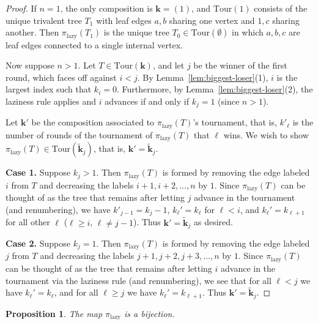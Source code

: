 \documentclass[11pt]{amsart}
\newcommand{\Tour}{\mathrm{Tour}}
\newcommand{\forget}{\pi_{\mathrm{lazy}}}
\newtheorem{prop}[thm]{Proposition}
\numberwithin{thm}{section}
\numberwithin{equation}{section}
\numberwithin{figure}{section}
\theoremstyle{definition}
\begin{document}
\begin{proof}
  If $n=1$, the only composition is $\mathbf{k}=(1)$, and $\Tour(1)$ consists of the unique trivalent tree $T_1$ with leaf edges $a,b$ sharing one vertex and $1,c$ sharing another.  Then $\forget(T_1)$ is the unique tree $T_0\in \Tour(\emptyset)$ in which $a,b,c$ are leaf edges connected to a single internal vertex. 
 
  Now suppose $n>1$.  Let $T\in \Tour(\mathbf{k})$, and let $j$ be the winner of the first round, which faces off against $i<j$. By Lemma~\ref{lem:biggest-loser}(1), $i$ is the largest index such that $k_i = 0$.  Furthermore, by Lemma~\ref{lem:biggest-loser}(2), the laziness rule applies and $i$ advances if and only if $k_j=1$ (since $n>1$).
  
  Let $\mathbf{k}'$ be the composition associated to $\forget(T)$'s tournament, that is, $k'_\ell$ is the number of rounds of the tournament of $\forget(T)$ that $\ell$ wins. We wish to show $\forget(T) \in \Tour(\widetilde{\mathbf{k}}_j)$, that is, $\mathbf{k}' = \widetilde{\mathbf{k}}_j$.
  
  \textbf{Case 1.} Suppose $k_j>1$. Then $\forget(T)$ is formed by removing the edge labeled $i$ from $T$ and decreasing the labels $i+1,i+2,\ldots,n$ by $1$.
  Since $\forget(T)$ can be thought of as the tree that remains after letting $j$ advance in the tournament (and renumbering), we have $k'_{j-1}=k_j-1$, $k_\ell'=k_\ell$ for $\ell<i$, and $k_\ell'=k_{\ell+1}$ for all other $\ell$ ($\ell\ge i$, $\ell\neq j-1$).  Thus $\mathbf{k}'=\widetilde{\mathbf{k}}_j$ as desired.
  
  \textbf{Case 2.} Suppose $k_j=1$.  Then $\forget(T)$ is formed by removing the edge labeled $j$ from $T$ and decreasing the labels $j+1,j+2,j+3,\ldots,n$ by $1$.  
  Since $\forget(T)$ can be thought of as the tree that remains after letting $i$ advance in the tournament via the laziness rule (and renumbering), we see that for all $\ell<j$ we have $k_\ell'=k_\ell$, and for all $\ell\ge j$ we have $k_\ell'=k_{\ell+1}$. Thus $\mathbf{k}'=\widetilde{\mathbf{k}}_j$.
\end{proof}

\begin{prop}\label{prop:bijection}
  The map $\forget$ is a bijection.
\end{prop}
\end{document}
